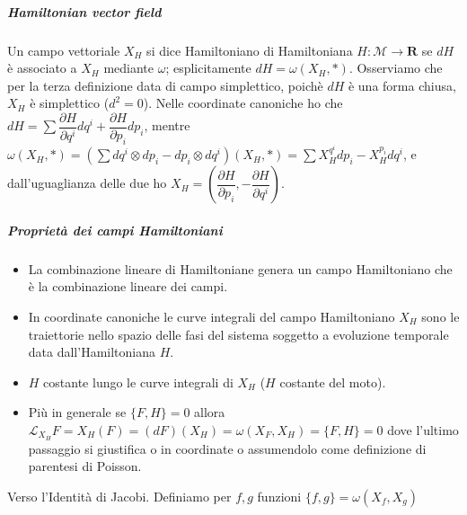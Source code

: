 \documentclass[]{article}
\newcommand{\w}{\omega}
\begin{document}
\subparagraph{Hamiltonian vector field}
Un campo vettoriale $X_H$ si dice Hamiltoniano di Hamiltoniana $H:\mathcal{M}\rightarrow \mathbf{R}$ se $dH$ è associato a $X_H$ mediante $\w$; esplicitamente $dH = \w(X_H, *)$. Osserviamo che per la terza definizione data di campo simplettico, poichè $dH$ è una forma chiusa, $X_H$ è simplettico ($d^2=0$). Nelle coordinate canoniche ho che $dH = \sum \dfrac{\partial H}{\partial q^i} dq^i + \dfrac{\partial H}{\partial p_i} dp_i$, mentre $\w (X_H, *) = (\sum dq^i \otimes dp_i - dp_i \otimes dq^i) (X_H, *) = \sum X_H^{q^i} dp_i - X_H^{p_i} dq^i$, e dall'uguaglianza delle due ho $X_H = \left(\dfrac{\partial H}{\partial p_i}, -\dfrac{\partial H}{\partial q^i}\right)$.

\subparagraph{Proprietà dei campi Hamiltoniani}
\begin{itemize}
	\item La combinazione lineare di Hamiltoniane genera un campo Hamiltoniano che è la combinazione lineare dei campi.
	\item In coordinate canoniche le curve integrali del campo Hamiltoniano $X_H$ sono le traiettorie nello spazio delle fasi del sistema soggetto a evoluzione temporale data dall'Hamiltoniana $H$. 
	\item $H$ costante lungo le curve integrali di $X_H$ ($H$ costante del moto).
	\item Più in generale se $\{F, H\} = 0$ allora $\mathcal{L}_{X_H} F = X_H(F) = (dF)(X_H) = \w (X_F, X_H) = \{F, H\} = 0$ dove l'ultimo passaggio si giustifica o in coordinate o assumendolo come definizione di parentesi di Poisson.
\end{itemize}
Verso l'Identità di Jacobi. Definiamo per $f,g$ funzioni $\{f, g\} = \w(X_f, X_g)$
\end{document}
